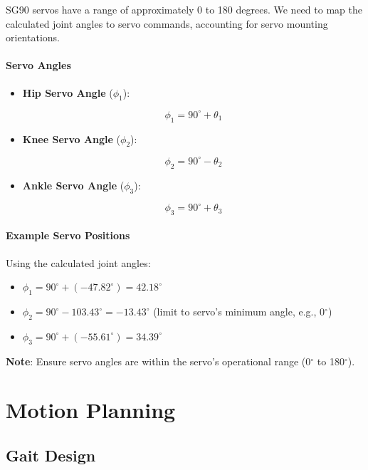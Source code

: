 \documentclass{article}
\begin{document}
SG90 servos have a range of approximately 0 to 180 degrees. We need to map the calculated joint angles to servo commands, accounting for servo mounting orientations.

\paragraph{Servo Angles}

\begin{itemize}
    \item \textbf{Hip Servo Angle} ($\phi_1$):

    \[
    \phi_1 = 90^\circ + \theta_1
    \]

    \item \textbf{Knee Servo Angle} ($\phi_2$):

    \[
    \phi_2 = 90^\circ - \theta_2
    \]

    \item \textbf{Ankle Servo Angle} ($\phi_3$):

    \[
    \phi_3 = 90^\circ + \theta_3
    \]

\end{itemize}

\paragraph{Example Servo Positions}

Using the calculated joint angles:

\begin{itemize}
    \item $\phi_1 = 90^\circ + (-47.82^\circ) = 42.18^\circ$
    \item $\phi_2 = 90^\circ - 103.43^\circ = -13.43^\circ$ (limit to servo's minimum angle, e.g., 0$^\circ$)
    \item $\phi_3 = 90^\circ + (-55.61^\circ) = 34.39^\circ$
\end{itemize}

\textbf{Note}: Ensure servo angles are within the servo's operational range (0$^\circ$ to 180$^\circ$).

\section{Motion Planning}

\subsection{Gait Design}
\end{document}
